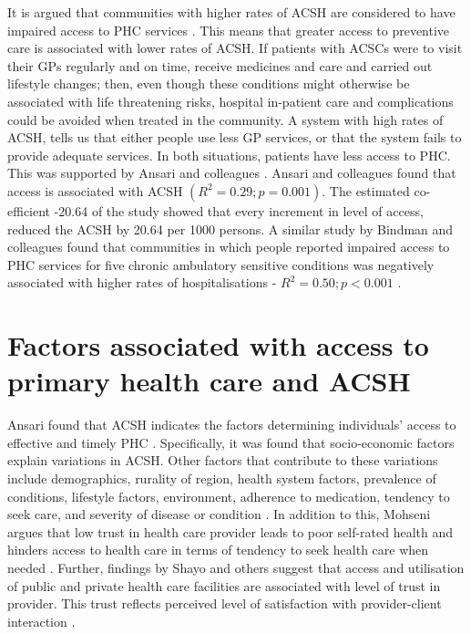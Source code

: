 It is argued that communities with higher rates of ACSH are considered to have impaired access to PHC services \cite{ansari2012patient,ansari2006access,laditka2003hospital,bindman1995preventable,billings1993impact,millman1993access}. This means that greater access to preventive care is associated with lower rates of ACSH. If patients with ACSCs were to visit their GPs regularly and on time, receive medicines and care and carried out lifestyle changes; then, even though these conditions might otherwise be associated with life threatening risks, hospital in-patient care and complications could be avoided when treated in the community. A system with high rates of ACSH, tells us that either people use less GP services, or that the system fails to provide adequate services. In both situations, patients have less access to PHC. This was supported by Ansari and colleagues \cite{ansari2006access}. Ansari and colleagues found that access is associated with ACSH $(R^2=0.29;p=0.001)$. The estimated co-efficient -20.64 of the study showed that every increment in level of access, reduced the ACSH by 20.64 per 1000 persons. A similar study by Bindman and colleagues found that communities in which people reported impaired access to PHC services for five chronic ambulatory sensitive conditions was negatively associated with higher rates of hospitalisations - $R^2=0.50;p<0.001$ \cite{bindman1995preventable}.

\section{Factors associated with access to primary health care and ACSH}

Ansari found that ACSH indicates the factors determining individuals' access to effective and timely PHC \cite{ansari2007concept}. Specifically, it was found that socio-economic factors explain variations in ACSH. Other factors that contribute to these variations include demographics, rurality of region, health system factors, prevalence of conditions, lifestyle factors, environment, adherence to medication, tendency to seek care, and severity of disease or condition \cite{ansari2007concept}. In addition to this, Mohseni argues that low trust in health care provider leads to poor self-rated health and hinders access to health care in terms of tendency to seek health care when needed \cite{mohseni2007social}. Further, findings by Shayo and others suggest that access and utilisation of public and private health care facilities are associated with level of trust in provider. This trust reflects perceived level of satisfaction with provider-client interaction \cite{shayo2016access}. 


